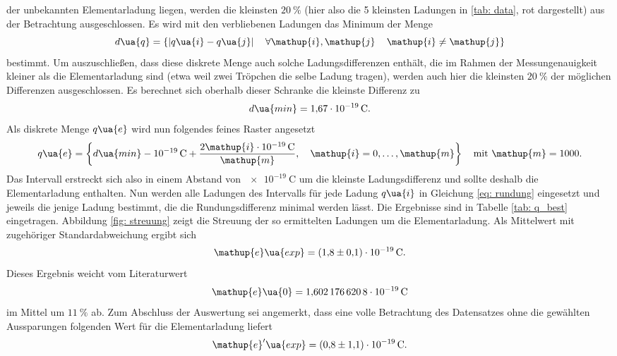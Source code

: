 der unbekannten Elementarladung liegen, werden die kleinsten $\SI{20}{\percent}$ (hier also die 5 kleinsten Ladungen in \ref{tab: data}, rot dargestellt)
aus der Betrachtung ausgeschlossen. Es wird mit den verbliebenen Ladungen das Minimum der Menge
\begin{equation}
  d\ua{q} = \left\{ \left| q\ua{i} - q\ua{j}\right| \quad \forall  \mathup{i}, \mathup{j} \, \quad \mathup{i} \neq \mathup{j}   \right\}
\end{equation}
bestimmt. Um auszuschließen, dass diese diskrete Menge auch solche Ladungsdifferenzen enthält, die im Rahmen der Messungenauigkeit
kleiner als die Elementarladung sind (etwa weil zwei Tröpchen die selbe Ladung tragen), werden auch hier die kleinsten $\SI{20}{\percent}$ der möglichen Differenzen ausgeschlossen.
Es berechnet sich oberhalb dieser Schranke die kleinste Differenz zu
\begin{equation}
  d\ua{min} = \SI{1.67e-19}{\coulomb}.
\end{equation}
Als diskrete Menge $q\ua{e}$ wird nun folgendes feines Raster angesetzt
\begin{equation}
  q\ua{e} = \left\{ d\ua{min} - \SI{e-19}{\coulomb}  +  \frac{2\mathup{i} \cdot \SI{e-19}{\coulomb}}{\mathup{m}}, \quad \mathup{i} = 0, \dots, \mathup{m}     \right\}\quad \text{mit} \, \,\mathup{m} = 1000.
\end{equation}
Das Intervall erstreckt sich also in einem Abstand von $\SI{e-19}{\coulomb}$ um die kleinste Ladungsdifferenz und sollte deshalb die Elementarladung enthalten.
Nun werden alle Ladungen des Intervalls für jede Ladung $q\ua{i}$ in Gleichung \eqref{eq: rundung} eingesetzt und jeweils die jenige Ladung bestimmt,
die die Rundungsdifferenz minimal werden lässt. Die Ergebnisse sind in Tabelle \ref{tab: q_best} eingetragen. Abbildung \ref{fig: streuung} zeigt die Streuung
der so ermittelten Ladungen um die Elementarladung. Als Mittelwert mit zugehöriger Standardabweichung ergibt sich
\begin{equation}
  \mathup{e}\ua{exp} = \SI{+1.8(1)e-19}{\coulomb}.
\end{equation}
Dieses Ergebnis weicht vom Literaturwert
\begin{equation}
  \mathup{e}\ua{0} = \SI{1.6021766208e-19}{\coulomb}
\end{equation}
im Mittel um $\SI{11}{\percent}$ ab. Zum Abschluss der Auswertung sei angemerkt, dass eine volle Betrachtung des Datensatzes ohne
die gewählten Aussparungen folgenden Wert für die Elementarladung liefert
\begin{equation}
   \mathup{e}'\ua{exp} = \SI{+0.8(11)e-19}{\coulomb}.
\end{equation}
